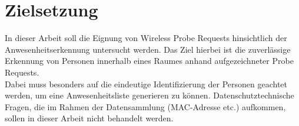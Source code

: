 \section{Zielsetzung}

In dieser Arbeit soll die Eignung von Wireless Probe Requests hinsichtlich der Anwesenheitserkennung untersucht werden.
Das Ziel hierbei ist die zuverlässige Erkennung von Personen innerhalb eines Raumes anhand aufgezeichneter Probe Requests.
\\

Dabei muss besonders auf die eindeutige Identifizierung der Personen geachtet werden, um eine Anwesenheitsliste generieren zu können.
Datenschutztechnische Fragen, die im Rahmen der Datensammlung (MAC-Adresse etc.) aufkommen, sollen in dieser Arbeit nicht behandelt werden.